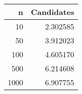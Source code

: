 \begin{table}
\label{tab:exp_candidates}
\begin{tabular}{rr}
\toprule
n & Candidates \\
\midrule
10 & 2.302585 \\
50 & 3.912023 \\
100 & 4.605170 \\
500 & 6.214608 \\
1000 & 6.907755 \\
\bottomrule
\end{tabular}
\end{table}

